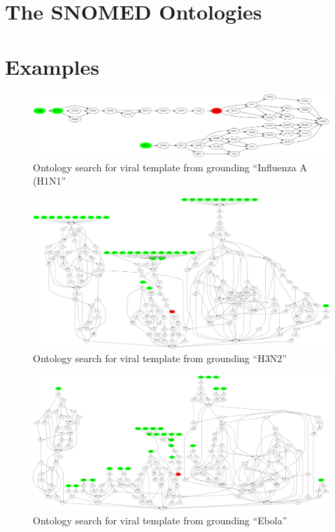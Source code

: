 \documentclass[11pt]{article}
\theoremstyle{definition}
\begin{document}
\section{The SNOMED Ontologies}

\section{Examples}

\begin{figure}
  \begin{center}
    \includegraphics[width=\textwidth]{H1N1.png}
  \end{center}
  \caption{Ontology search for viral template from grounding
    ``Influenza A (H1N1''}
\end{figure}

\begin{figure}
  \includegraphics[width=\textwidth]{H3N2map.png}
  \caption{Ontology search for viral template from grounding ``H3N2''}
\end{figure}

\begin{figure}
  \includegraphics[width=\textwidth]{Ebolamap.png}
  \caption{Ontology search for viral template from grounding ``Ebola''}
\end{figure}
\end{document}
